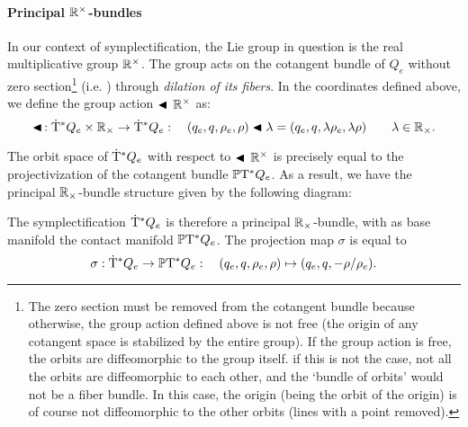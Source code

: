 \paragraph{Principal \texorpdfstring{\(\mathbb{R}^\times\)}{R}-bundles} In our context of symplectification, the Lie group in question is the real multiplicative group \(\mathbb{R}^\times\). The group acts on the cotangent bundle of \(Q_e\) without zero section\footnote
{
    The zero section must be removed from the cotangent bundle because otherwise, the group action defined above is not free (the origin of any cotangent space is stabilized by the entire group). If the group action is free, the orbits are diffeomorphic to the group itself. if this is not the case, not all the orbits are diffeomorphic to each other, and the `bundle of orbits' would not be a fiber bundle. In this case, the origin (being the orbit of the origin) is of course not diffeomorphic to the other orbits (lines with a point removed).
}
(i.e. ) through \emph{dilation of its fibers}. In the coordinates defined above, we define the group action \(\blacktriangleleft\,\mathbb{R}^\times\) as:
\begin{equation}
     \blacktriangleleft\,: \mathrm{\dot{T}}^*Q_e\times\mathbb{R}_{\times} \to \mathrm{\dot{T}}^*Q_e : \quad (q_e, q, \rho_e, \rho) \blacktriangleleft \lambda = (q_e, q, \lambda \rho_e, \lambda \rho ) \qquad \lambda \in \mathbb{R}_{\times}.
\end{equation}

The orbit space of \(\mathrm{\dot{T}}^*Q_e\) with respect to \(\blacktriangleleft\,\mathbb{R}^\times\) is precisely equal to the projectivization of the cotangent bundle \(\mathbb{P}\mathrm{T}^* Q_e\). As a result, we have the principal \(\mathbb{R}_{\times}\)-bundle structure given by the following diagram:
\begin{center}
\end{center}

The symplectification \(\mathrm{\dot{T}}^*Q_e\) is therefore a principal \(\mathbb{R}_{\times}\)-bundle, with as base manifold the contact manifold \(\mathbb{P}\mathrm{T}^* Q_e\). The projection map \(\sigma\) is equal to
\begin{equation}
     \sigma: \mathrm{\dot{T}}^*Q_e \to \mathbb{P}\mathrm{T}^* Q_e: \quad (q_e, q, \rho_e, \rho) \mapsto (q_e, q, -\rho/\rho_e).
\end{equation}


